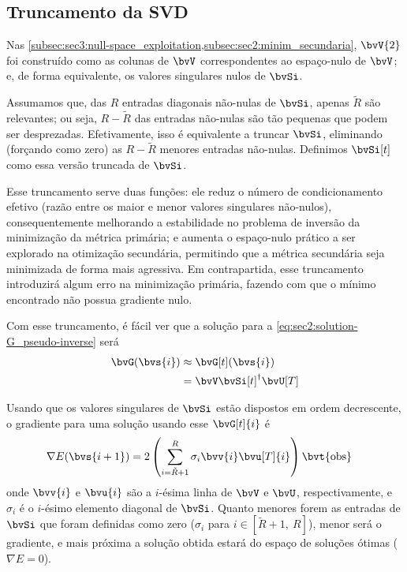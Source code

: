 \subsection{Truncamento da SVD}
\label{subsec:sec2:truncamento}

Nas \cref{subsec:sec3:null-space_exploitation,subsec:sec2:minim_secundaria}, $\bvV{2}$ foi construído como as colunas de $\bvV$ correspondentes ao espaço-nulo de $\bvV$; e, de forma equivalente, os valores singulares nulos de $\bvSi$.

Assumamos que, das $R$ entradas diagonais não-nulas de $\bvSi$, apenas $\tilde{R}$ são relevantes; ou seja, $R-\tilde{R}$ das entradas não-nulas são tão pequenas que podem ser desprezadas. Efetivamente, isso é equivalente a truncar $\bvSi$, eliminando (forçando como zero) as $R-\tilde{R}$ menores entradas não-nulas. Definimos $\bvSi[t]$ como essa versão truncada de $\bvSi$.

Esse truncamento serve duas funções: ele reduz o número de condicionamento efetivo (razão entre os maior e menor valores singulares não-nulos), consequentemente melhorando a estabilidade no problema de inversão da minimização da métrica primária; e aumenta o espaço-nulo prático a ser explorado na otimização secundária, permitindo que a métrica secundária seja minimizada de forma mais agressiva. Em contrapartida, esse truncamento introduzirá algum erro na minimização primária, fazendo com que o mínimo encontrado não possua gradiente nulo.

Com esse truncamento, é fácil ver que a solução para a \cref{eq:sec2:solution-G_pseudo-inverse} será
\begin{equation}
	\begin{split}
		\bvG(\bvs{i}) & \approx \bvG[t](\bvs{i}) \\
		& = \bvV \pinv{\bvSi[t]} \bvU[T]
	\end{split}
\end{equation}

Usando que os valores singulares de $\bvSi$ estão dispostos em ordem decrescente, o gradiente para uma solução usando esse $\bvG[t]{i}$ é
\begin{equation}
	\begin{split}
		\nabla E(\bvs{i+1})
		& = 2\pts{\sum_{i=\tilde{R}+1}^{R} \sigma_i \bvv{i} \bvu[T]{i}} \bvt{\obs}
	\end{split}
\end{equation}
onde $\bvv{i}$ e $\bvu{i}$ são a $i$-ésima linha de $\bvV$ e $\bvU$, respectivamente, e $\sigma_i$ é o $i$-ésimo elemento diagonal de $\bvSi$. Quanto menores forem as entradas de $\bvSi$ que foram definidas como zero ($\sigma_i$ para $i \in [\tilde{R}+1,~R]$), menor será o gradiente, e mais próxima a solução obtida estará do espaço de soluções ótimas ($\nabla E = 0$).

